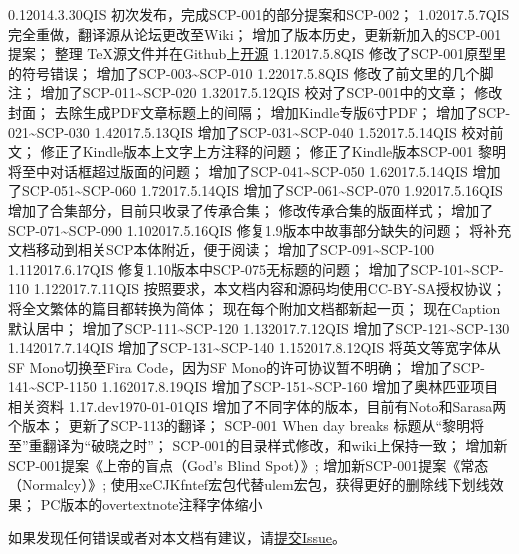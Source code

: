 


\begin{versionhistory}
\vhEntry
{0.1}{2014.3.30}{QIS}{
	初次发布，完成SCP-001的部分提案和SCP-002；
}
\vhEntry
{1.0}{2017.5.7}{QIS}{
	完全重做，翻译源从论坛更改至Wiki；
	增加了版本历史，更新新加入的SCP-001提案；
	整理 \TeX 源文件并在Github上\href{https://github.com/7sDream/scp-pdf}{开源}
}
\vhEntry
{1.1}{2017.5.8}{QIS}{
	修改了SCP-001原型里的符号错误；
	增加了SCP-003\textasciitilde SCP-010
}
\vhEntry
{1.2}{2017.5.8}{QIS}{
	修改了前文里的几个脚注；
	增加了SCP-011\textasciitilde SCP-020
}
\vhEntry
{1.3}{2017.5.12}{QIS}{
	校对了SCP-001中的文章；
	修改封面；
	去除生成PDF文章标题上的间隔；
	增加Kindle专版6寸PDF；
	增加了SCP-021\textasciitilde SCP-030
}
\vhEntry
{1.4}{2017.5.13}{QIS}{
    增加了SCP-031\textasciitilde SCP-040
}
\vhEntry
{1.5}{2017.5.14}{QIS}{
    校对前文；
    修正了Kindle版本上文字上方注释的问题；
    修正了Kindle版本SCP-001 黎明将至中对话框超过版面的问题；
    增加了SCP-041\textasciitilde SCP-050
}
\vhEntry
{1.6}{2017.5.14}{QIS}{
    增加了SCP-051\textasciitilde SCP-060
}
\vhEntry
{1.7}{2017.5.14}{QIS}{
    增加了SCP-061\textasciitilde SCP-070
}
\vhEntry
{1.9}{2017.5.16}{QIS}{
    增加了合集部分，目前只收录了传承合集；
    修改传承合集的版面样式；
    增加了SCP-071\textasciitilde SCP-090
}
\vhEntry
{1.10}{2017.5.16}{QIS}{
    修复1.9版本中故事部分缺失的问题；
    将补充文档移动到相关SCP本体附近，便于阅读；
    增加了SCP-091\textasciitilde SCP-100
}
\vhEntry
{1.11}{2017.6.17}{QIS}{
    修复1.10版本中SCP-075无标题的问题；
    增加了SCP-101\textasciitilde SCP-110
}
\vhEntry
{1.12}{2017.7.11}{QIS}{
    按照要求，本文档内容和源码均使用CC-BY-SA授权协议；
    将全文繁体的篇目都转换为简体；
    现在每个附加文档都新起一页；
    现在Caption默认居中；
    增加了SCP-111\textasciitilde SCP-120
}
\vhEntry
{1.13}{2017.7.12}{QIS}{
    增加了SCP-121\textasciitilde SCP-130
}
\vhEntry
{1.14}{2017.7.14}{QIS}{
    增加了SCP-131\textasciitilde SCP-140
}
\vhEntry
{1.15}{2017.8.12}{QIS}{
    将英文等宽字体从SF Mono切换至Fira Code，因为SF Mono的许可协议暂不明确；
    增加了SCP-141\textasciitilde SCP-1150
}
\vhEntry
{1.16}{2017.8.19}{QIS}{
    增加了SCP-151\textasciitilde SCP-160
    增加了奥林匹亚项目相关资料
}
\vhEntry
{1.17.dev}{\today}{QIS}{
    增加了不同字体的版本，目前有Noto和Sarasa两个版本；
    更新了SCP-113的翻译；
    SCP-001 When day breaks 标题从“黎明将至”重翻译为“破晓之时”；
    SCP-001的目录样式修改，和wiki上保持一致；
    增加新SCP-001提案《上帝的盲点（God's Blind Spot）》;
    增加新SCP-001提案《常态（Normalcy）》;
    使用xeCJKfntef宏包代替ulem宏包，获得更好的删除线下划线效果；
    PC版本的overtextnote注释字体缩小
}
\end{versionhistory}

如果发现任何错误或者对本文档有建议，请\href{https://github.com/7sDream/scp-pdf/issues}{提交Issue}。
